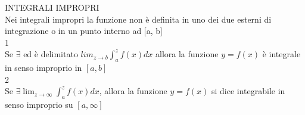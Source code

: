 \documentclass[11pt]{article}
\begin{document}
INTEGRALI IMPROPRI\\
Nei integrali impropri la funzione non è definita in uno dei due esterni di integrazione o in un punto interno ad [a, b]\\

1\\
Se $\exists$ ed è delimitato $lim_{z \rightarrow b} \int_a^z f(x) dx$ allora la funzione $y=f(x)$ è integrale in senso improprio in $[a, b]$
\\[10pt]
2\\
Se $\exists \lim_{z \rightarrow \infty} \int_a^z f(x) dx$, allora la funzione $y=f(x)$ si dice integrabile in senso improprio su $[a, \infty]$ 
\end{document}
